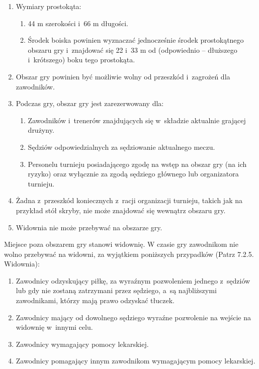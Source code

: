 \documentclass[12pt,a4paper]{article}
\renewcommand{\paragraph}[1]{
  \oldparagraph{#1}%
  \leftskip2.8cm
}
\begin{document}
\begin{enumerate}
	\item Wymiary prostokąta:
	      \begin{enumerate}
		      \item 44 m szerokości i~66 m długości.
		      \item Środek boiska powinien wyznaczać jednocześnie środek prostokątnego
		            obszaru gry i~znajdować się 22 i~33 m od (odpowiednio -- dłuższego i~krótszego) boku tego prostokąta.
	      \end{enumerate}

	\item Obszar gry powinien być możliwie wolny od przeszkód i~zagrożeń dla
	      zawodników.

	\item Podczas gry, obszar gry jest zarezerwowany dla:
	      \begin{enumerate}
		      \item Zawodników i~trenerów znajdujących się w~składzie aktualnie grającej
		            drużyny.
		      \item Sędziów odpowiedzialnych za sędziowanie aktualnego meczu.
		      \item Personelu turnieju posiadającego zgodę na wstęp na obszar gry (na
		            ich ryzyko) oraz wyłącznie za zgodą sędziego głównego lub
		            organizatora turnieju.
	      \end{enumerate}

	\item Żadna z~przeszkód koniecznych z~racji organizacji turnieju, takich jak
	      na przykład stół skryby, nie może znajdować się wewnątrz obszaru gry.

	\item Widownia nie może przebywać na obszarze gry.
\end{enumerate}

\paragraph{Widownia}
Miejsce poza obszarem gry stanowi widownię.
W czasie gry zawodnikom nie wolno przebywać na widowni, za wyjątkiem
poniższych przypadków (Patrz 7.2.5. Widownia):

\begin{enumerate}
	\item Zawodnicy odzyskujący piłkę, za wyraźnym pozwoleniem jednego z~sędziów lub gdy nie zostaną zatrzymani przez sędziego, a~są najbliższymi zawodnikami, którzy mają prawo odzyskać tłuczek.

	\item Zawodnicy mający od dowolnego sędziego wyraźne pozwolenie na wejście
	      na widownię w~innymi celu.

	\item Zawodnicy wymagający pomocy lekarskiej.

	\item Zawodnicy pomagający innym zawodnikom wymagającym pomocy lekarskiej.
\end{enumerate}
\end{document}
